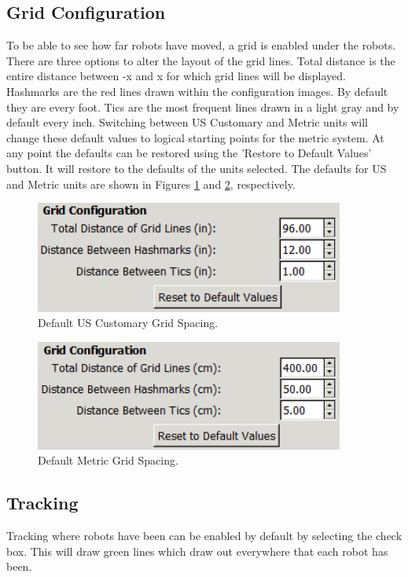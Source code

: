 \documentclass{article}
\begin{document}
\subsection{Grid Configuration}
To be able to see how far robots have moved, a grid is enabled under the robots.
There are three options to alter the layout of the grid lines.  Total distance
is the entire distance between -x and x for which grid lines will be displayed.
Hashmarks are the red lines drawn within the configuration images.  By default
they are every foot.  Tics are the most frequent lines drawn in a light gray
and by default every inch.  Switching between US Customary and Metric units will
change these default values to logical starting points for the metric system.
At any point the defaults can be restored using the 'Restore to Default Values'
button.  It will restore to the defaults of the units selected.  The defaults
for US and Metric units are shown in Figures \ref{fig:us} and \ref{fig:metric},
respectively.
\begin{figure}[H]
	\begin{center}
		\includegraphics[width=4in]{images/grid_us}
	\end{center}
	\caption{Default US Customary Grid Spacing.}
	\label{fig:us}
\end{figure}
\begin{figure}[H]
	\begin{center}
		\includegraphics[width=4in]{images/grid_metric}
	\end{center}
	\caption{Default Metric Grid Spacing.}
	\label{fig:metric}
\end{figure}

\subsection{Tracking}
Tracking where robots have been can be enabled by default by selecting the
check box.  This will draw green lines which draw out everywhere that each robot
has been.
\end{document}
